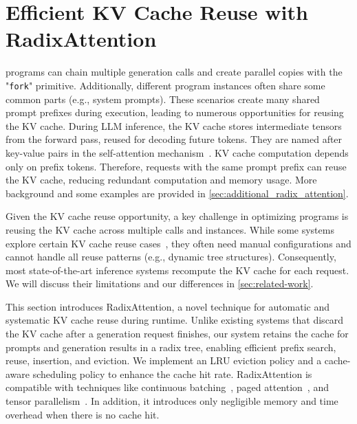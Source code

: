 \section{Efficient KV Cache Reuse with RadixAttention}
\label{sec:radix_attention}


\lang programs can chain multiple generation calls and create parallel copies with the "\texttt{fork}" primitive.
Additionally, different program instances often share some common parts (e.g., system prompts). These scenarios create many shared prompt prefixes during execution, leading to numerous opportunities for reusing the KV cache.
During LLM inference, the KV cache stores intermediate tensors from the forward pass, reused for decoding future tokens. They are named after key-value pairs in the self-attention mechanism~\cite{vaswani2017attention}. KV cache computation depends only on prefix tokens. Therefore, requests with the same prompt prefix can reuse the KV cache, reducing redundant computation and memory usage. More background and some examples are provided in \autoref{sec:additional_radix_attention}.

Given the KV cache reuse opportunity, a key challenge in optimizing \lang programs is reusing the KV cache across multiple calls and instances. 
While some systems explore certain KV cache reuse cases~\cite{kwon2023vllm,ye2024chunkattention,juravsky2024hydragen,gim2023prompt}, they often need manual configurations and cannot handle all reuse patterns (e.g., dynamic tree structures). Consequently, most state-of-the-art inference systems recompute the KV cache for each request. We will discuss their limitations and our differences in \autoref{sec:related-work}.

This section introduces RadixAttention, a novel technique for automatic and systematic KV cache reuse during runtime. Unlike existing systems that discard the KV cache after a generation request finishes, our system retains the cache for prompts and generation results in a radix tree, enabling efficient prefix search, reuse, insertion, and eviction. We implement an LRU eviction policy and a cache-aware scheduling policy to enhance the cache hit rate. RadixAttention is compatible with techniques like continuous batching~\cite{yu2022orca}, paged attention~\cite{kwon2023vllm}, and tensor parallelism~\cite{shoeybi2019megatron}.
In addition, it introduces only negligible memory and time overhead when there is no cache hit.

